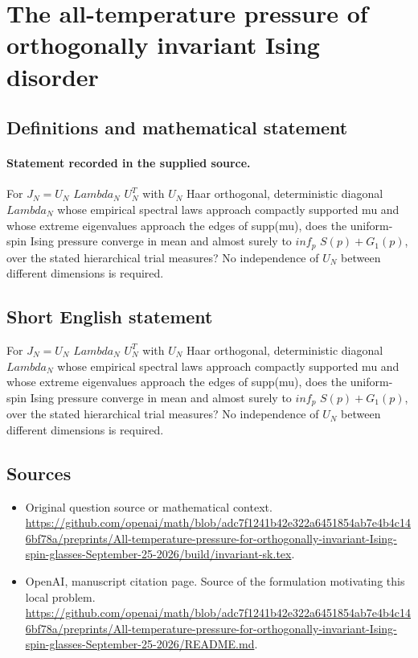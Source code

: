 \documentclass[11pt]{article}
\begin{document}
\section*{The all-temperature pressure of orthogonally invariant Ising disorder}\label{statement}
\subsection{Definitions and mathematical statement}
\paragraph{Statement recorded in the supplied source.}
For $J_N=U_N$ $Lambda_N$ $U_N^T$ with $U_N$ Haar orthogonal, deterministic diagonal $Lambda_N$ whose empirical spectral laws approach compactly supported mu and whose extreme eigenvalues approach the edges of supp(mu), does the uniform-spin Ising pressure converge in mean and almost surely to $inf_p$ ${S(p)+G_1(p)}$, over the stated hierarchical trial measures? No independence of $U_N$ between different dimensions is required.
\subsection{Short English statement}
For $J_N=U_N$ $Lambda_N$ $U_N^T$ with $U_N$ Haar orthogonal, deterministic diagonal $Lambda_N$ whose empirical spectral laws approach compactly supported mu and whose extreme eigenvalues approach the edges of supp(mu), does the uniform-spin Ising pressure converge in mean and almost surely to $inf_p$ ${S(p)+G_1(p)}$, over the stated hierarchical trial measures? No independence of $U_N$ between different dimensions is required.
\subsection{Sources}
\begin{itemize}
\item[S1] Original question source or mathematical context.
\url{https://github.com/openai/math/blob/adc7f1241b42e322a6451854ab7e4b4c146bf78a/preprints/All-temperature-pressure-for-orthogonally-invariant-Ising-spin-glasses-September-25-2026/build/invariant-sk.tex}.
\item[S2] OpenAI, manuscript citation page. Source of the formulation motivating this local problem.
\url{https://github.com/openai/math/blob/adc7f1241b42e322a6451854ab7e4b4c146bf78a/preprints/All-temperature-pressure-for-orthogonally-invariant-Ising-spin-glasses-September-25-2026/README.md}.
\end{itemize}
\end{document}
